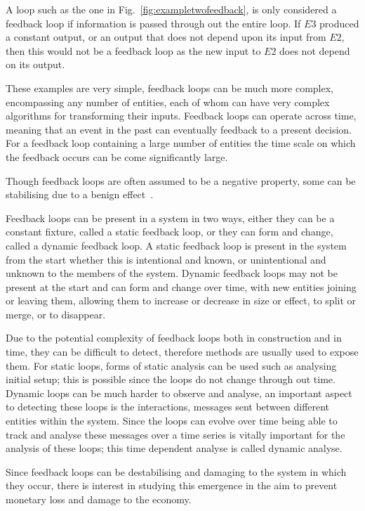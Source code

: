 \documentclass{article}
\begin{document}
A loop such as the one in Fig.~\ref{fig:exampletwofeedback}, is only considered a feedback loop if information is passed through out the entire loop. If $E3$ produced a constant output, or an output that does not depend upon its input from $E2$, then this would not be a feedback loop as the new input to $E2$ does not depend on its output.

These examples are very simple, feedback loops can be much more complex, encompassing any number of entities, each of whom can have very complex algorithms for transforming their inputs. Feedback loops can operate across time, meaning that an event in the past can eventually feedback to a present decision. For a feedback loop containing a large number of entities the time scale on which the feedback occurs can be come significantly large.

Though feedback loops are often assumed to be a negative property, some can be stabilising due to a benign effect~\cite{beginref}.

Feedback loops can be present in a system in two ways, either they can be a constant fixture, called a static feedback loop, or they can form and change, called a dynamic feedback loop. A static feedback loop is present in the system from the start whether this is intentional and known, or unintentional and unknown to the members of the system. Dynamic feedback loops may not be present at the start and can form and change over time, with new entities joining or leaving them, allowing them to increase or decrease in size or effect, to split or merge, or to disappear.

Due to the potential complexity of feedback loops both in construction and in time, they can be difficult to detect, therefore methods are usually used to expose them. For static loops, forms of static analysis can be used such as analysing initial setup; this is possible since the loops do not change through out time. Dynamic loops can be much harder to observe and analyse, an important aspect to detecting these loops is the interactions, messages sent between different entities within the system. Since the loops can evolve over time being able to track and analyse these messages over a time series is vitally important for the analysis of these loops; this time dependent analyse is called dynamic analyse.

Since feedback loops can be destabilising and damaging to the system in which they occur, there is interest in studying this emergence in the aim to prevent monetary loss and damage to the economy.
\end{document}
